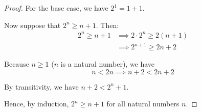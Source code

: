 \documentclass[12pt, letterpaper]{article}
\theoremstyle{definition} %
\begin{document}
\begin{enumerate}[label=\bfseries\arabic*.]
\begin{enumerate}[label=\bfseries(\alph*)]
\begin{proof}
        For the base case, we have $2^1 = 1+1$.

        Now suppose that $2^n \geq n+1$. Then:
        \begin{align*}
            2^n \geq n+1 &\implies 2 \cdot 2^n \geq 2(n+1) \\
                         &\implies 2^{n+1} \geq 2n + 2
        \end{align*}

        Because $n \geq 1$ ($n$ is a natural number), we have
        \begin{equation*}
            n < 2n \implies n+2 < 2n+2
        \end{equation*}

        By transitivity, we have $n+2 < 2^n+1$.

        Hence, by induction, $2^n \geq n+1$ for all natural numbers $n$.
    \end{proof}
\end{enumerate}

\end{enumerate}
\end{document}
